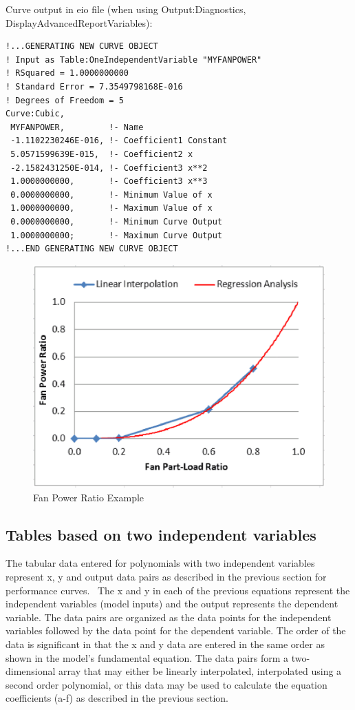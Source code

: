 Curve output in eio file (when using Output:Diagnostics, DisplayAdvancedReportVariables):

\begin{lstlisting}
!...GENERATING NEW CURVE OBJECT
! Input as Table:OneIndependentVariable "MYFANPOWER"
! RSquared = 1.0000000000
! Standard Error = 7.3549798168E-016
! Degrees of Freedom = 5
Curve:Cubic,
 MYFANPOWER,         !- Name
 -1.1102230246E-016, !- Coefficient1 Constant
 5.0571599639E-015,  !- Coefficient2 x
 -2.1582431250E-014, !- Coefficient3 x**2
 1.0000000000,       !- Coefficient3 x**3
 0.0000000000,       !- Minimum Value of x
 1.0000000000,       !- Maximum Value of x
 0.0000000000,       !- Minimum Curve Output
 1.0000000000;       !- Maximum Curve Output
!...END GENERATING NEW CURVE OBJECT
\end{lstlisting}

\begin{figure}[htbp]
\centering
\includegraphics{media/image7870.png}
\caption{Fan Power Ratio Example \protect \label{fig:fan-power-ratio-example}}
\end{figure}

\subsection{Tables based on two independent variables}\label{tables-based-on-two-independent-variables}

The tabular data entered for polynomials with two independent variables represent x, y and output data pairs as described in the previous section for performance curves.~ The x and y in each of the previous equations represent the independent variables (model inputs) and the output represents the dependent variable. The data pairs are organized as the data points for the independent variables followed by the data point for the dependent variable. The order of the data is significant in that the x and y data are entered in the same order as shown in the model's fundamental equation. The data pairs form a two-dimensional array that may either be linearly interpolated, interpolated using a second order polynomial, or this data may be used to calculate the equation coefficients (a-f) as described in the previous section.

